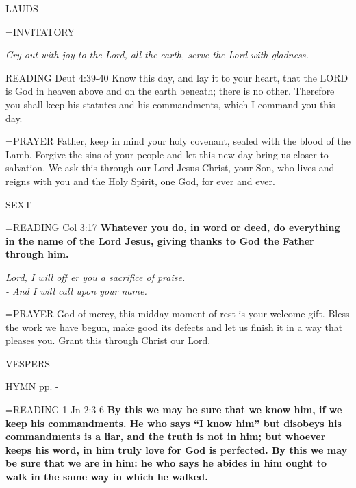 \begin{flushleft}\normalsize LAUDS\\\end{flushleft}

\hangindent=\parindent \small{INVITATORY}
\begin{center}
\textit{Cry out with joy to the Lord, all the earth, serve the Lord with gladness.\\}
\end{center}

READING Deut 4:39-40 Know this day, and lay it to your heart, that the LORD is God in heaven above and on the earth beneath; there is no other. Therefore you shall keep his statutes and his commandments, which I command you this day.

\hangindent=\parindent \small{PRAYER  Father, keep in mind your holy covenant, sealed with the blood of the Lamb. Forgive the sins of your people and let this new day bring us closer to salvation. We ask this through our Lord Jesus Christ, your Son, who lives and reigns with you and the Holy Spirit, one God, for ever and ever.}

\begin{flushleft}\normalsize SEXT\\\end{flushleft}

\hangindent=\parindent \small{READING} Col 3:17 \textbf{Whatever you do, in word or deed, do everything in the name of the Lord Jesus, giving thanks to God the Father through him.}

\begin{center}
\textit{Lord, I will off er you a sacrifice of praise.\\
- And I will call upon your name.}
\end{center}

\hangindent=\parindent \small{PRAYER  God of mercy, this midday moment of rest is your welcome gift. Bless the work we have begun, make good its defects and let us finish it in a way that pleases you. Grant this through Christ our Lord.}

\begin{flushleft}\normalsize VESPERS\\\end{flushleft}

HYMN pp. \pageref{ordinaryTime:fourthHymn} - \pageref{ordinaryTime:sixthHymn}

\hangindent=\parindent \small{READING} 1 Jn 2:3-6 \textbf{By this we may be sure that we know him, if we keep his commandments. He who says “I know him” but disobeys his commandments is a liar, and the truth is not in him; but whoever keeps his word, in him truly love for God is perfected. By this we may be sure that we are in him: he who says he abides in him ought to walk in the same way in which he walked.\\}

